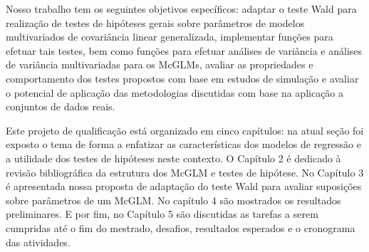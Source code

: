 Nosso trabalho tem os seguintes objetivos específicos: adaptar o teste Wald para realização de testes de hipóteses gerais sobre parâmetros de modelos multivariados de covariância linear generalizada, implementar funções para efetuar tais testes, bem como funções para efetuar análises de variância e análises de variância multivariadas para os McGLMs, avaliar as propriedades e comportamento dos testes propostos com base em estudos de simulação e avaliar o potencial de aplicação das metodologias discutidas com base na aplicação a conjuntos de dados reais.

Este projeto de qualificação está organizado em cinco capítulos: na atual seção foi exposto o tema de forma a enfatizar as características dos modelos de regressão e a utilidade dos testes de hipóteses neste contexto. O Capítulo 2 é dedicado à revisão bibliográfica da estrutura dos McGLM e testes de hipótese. No Capítulo 3 é apresentada nossa proposta de adaptação do teste Wald para avaliar suposições sobre parâmetros de um McGLM. No capítulo 4 são mostrados os resultados preliminares. E por fim, no Capítulo 5 são discutidas as tarefas a serem cumpridas até o fim do mestrado, desafios, resultados esperados e o cronograma das atividades.

